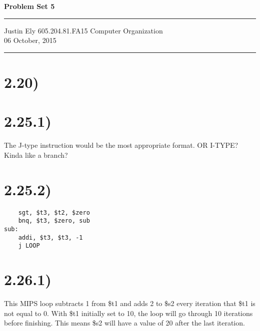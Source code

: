 \documentclass[a4paper,11pt]{article}
\begin{document}
\begin{flushright}

\vspace{1.1cm}

{\bf\Huge Problem Set 5}

\rule{0.25\linewidth}{0.5pt}

\vspace{0.5cm}
Justin Ely
\linebreak
\newline
\footnotesize{605.204.81.FA15 Computer Organization\\}
\vspace{0.5cm}
06 October, 2015
\end{flushright}

\noindent\rule{\linewidth}{1.0pt}



\section*{2.20)}


\section*{2.25.1)}

The J-type instruction would be the most appropriate format.  OR I-TYPE?  Kinda like a branch?

\section*{2.25.2)}
\begin{verbatim}
    sgt, $t3, $t2, $zero
    bnq, $t3, $zero, sub
sub:
    addi, $t3, $t3, -1
    j LOOP
\end{verbatim}


\section*{2.26.1)}
This MIPS loop subtracts 1 from \$t1 and adds 2 to \$s2 every iteration that \$t1 is not equal to 0.  With \$t1 initially set to
10, the loop will go through 10 iterations before finishing.  This means \$s2 will have a value of 20 after the last iteration.
\end{document}
